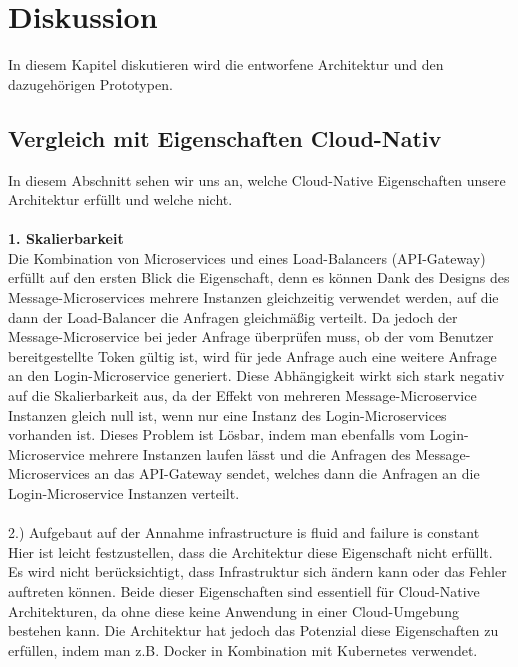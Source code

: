\chapter{Diskussion}
In diesem Kapitel diskutieren wird die entworfene Architektur und den dazugehörigen Prototypen.

\section{Vergleich mit Eigenschaften Cloud-Nativ}
In diesem Abschnitt sehen wir uns an, welche Cloud-Native Eigenschaften unsere Architektur erfüllt und welche nicht.\\
\\
\textbf{1. Skalierbarkeit}\\
Die Kombination von Microservices und eines Load-Balancers (API-Gateway) erfüllt auf den ersten Blick die Eigenschaft, denn es können Dank des Designs des Message-Microservices mehrere Instanzen gleichzeitig verwendet werden, auf die dann der Load-Balancer die Anfragen gleichmäßig verteilt. Da jedoch der Message-Microservice bei jeder Anfrage überprüfen muss, ob der vom Benutzer bereitgestellte Token gültig ist, wird für jede Anfrage auch eine weitere Anfrage an den Login-Microservice generiert. Diese Abhängigkeit wirkt sich stark negativ auf die Skalierbarkeit aus, da der Effekt von mehreren Message-Microservice Instanzen gleich null ist, wenn nur eine Instanz des Login-Microservices vorhanden ist. Dieses Problem ist Lösbar, indem man ebenfalls vom Login-Microservice mehrere Instanzen laufen lässt und die Anfragen des Message-Microservices an das API-Gateway sendet, welches dann die Anfragen an die Login-Microservice Instanzen verteilt.\\
\\
2.) Aufgebaut auf der Annahme \glqq infrastructure is fluid and failure is constant\grqq{}\\
Hier ist leicht festzustellen, dass die Architektur diese Eigenschaft nicht erfüllt. Es wird nicht berücksichtigt, dass Infrastruktur sich ändern kann oder das Fehler auftreten können. Beide dieser Eigenschaften sind essentiell für Cloud-Native Architekturen, da ohne diese keine Anwendung in einer Cloud-Umgebung bestehen kann. Die Architektur hat jedoch das Potenzial diese Eigenschaften zu erfüllen, indem man z.B. Docker in Kombination mit Kubernetes verwendet.\\
\\
